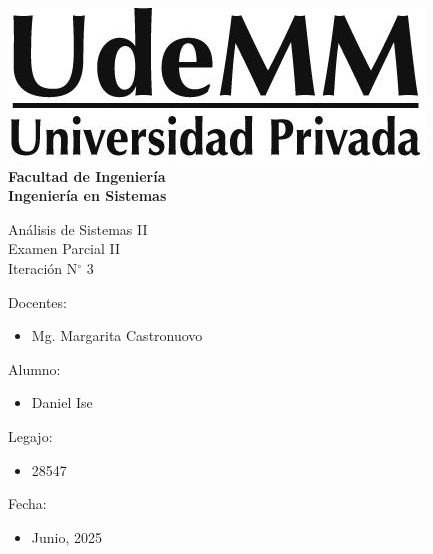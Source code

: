 \begin{titlepage}
    \begin{center}
        \vspace*{.5cm}
        \includegraphics[scale=.5]{img/udemm-logo.png}\\
        \vspace{.2cm}
        \Large
        \textbf{Facultad de Ingeniería}\\
        \textbf{Ingeniería en Sistemas}\\
        \vspace{2cm}

        \Huge
        Análisis de Sistemas II \\
        Examen Parcial II \\
        Iteración N\(^\circ\) 3 \\
        \vfill

        \raggedright
        \Large
        Docentes:
        \begin{itemize}
            \item[] Mg. Margarita Castronuovo \\
        \end{itemize}
        Alumno:
        \begin{itemize}
            \item[] Daniel Ise
        \end{itemize}
        Legajo:
        \begin{itemize}
            \item[] 28547
        \end{itemize}
        Fecha:
        \begin{itemize}
            \item[] Junio, 2025
        \end{itemize}
    \end{center}
\end{titlepage}
